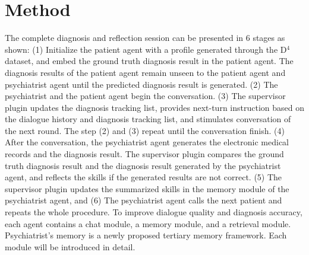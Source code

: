 \section{Method}
\label{sec:method}

The complete diagnosis and reflection session can be presented in 6 stages as shown: (1) Initialize the patient agent with a profile generated through the D$^4$ dataset, and embed the ground truth diagnosis result in the patient agent. The diagnosis results of the patient agent remain unseen to the patient agent and psychiatrist agent until the predicted diagnosis result is generated. (2) The psychiatrist and the patient agent begin the conversation. (3) The supervisor plugin updates the diagnosis tracking list, provides next-turn instruction based on the dialogue history and diagnosis tracking list, and stimulates conversation of the next round. The step (2) and (3) repeat until the conversation finish. (4) After the conversation, the psychiatrist agent generates the electronic medical records and the diagnosis result. The supervisor plugin compares the ground truth diagnosis result and the diagnosis result generated by the psychiatrist agent, and reflects the skills if the generated results are not correct. (5) The supervisor plugin updates the summarized skills in the memory module of the psychiatrist agent, and (6) The psychiatrist agent calls the next patient and repeats the whole procedure.
To improve dialogue quality and diagnosis accuracy, each agent contains a chat module, a memory module, and a retrieval module. Psychiatrist's memory is a newly proposed tertiary memory framework. Each module will be introduced in detail.

